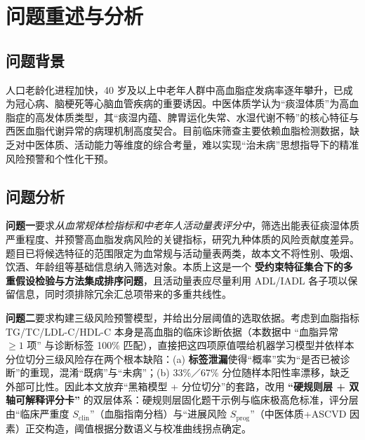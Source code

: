 \documentclass{MathorCupmodeling}
\begin{document}
\begin{abstract}
\textbf{问题三}：构建 6 个月有限时域\textbf{动态规划}模型。决策变量为每月的调理分级 $L_t$、活动强度 $s_t$、周训练频次 $f_t$；严格整合年龄、评分、预算（$\le 2000$ 元）等约束以及附表 3 的动力学公式；设计四项复合目标 $J = \alpha P_6 + \beta \text{Cost} + \gamma \sum \max(0, f_t - 5) + \delta \sum(3 - s_t)$。求解 278 名痰湿体质患者的方案，发现明确匹配规律：\textbf{年龄越小、活动能力越强的患者趋向高强度低频次方案}（$s=2\text{--}3$，$f=5$，平均降幅 31\%）；年龄组 5 或活动量表 $<40$ 的患者仅能选 1 级强度（平均降幅 17.9\%）。样本 1（女，50--59，$P_0=64$，$\text{Act}=38$）总成本 700 元，$P_6=50.57$（降 21.0\%）；样本 2（男，40--49，$P_0=58$，$\text{Act}=40$）总成本 780 元，$P_6=40.02$（降 31.0\%）；样本 3（女，40--49，$P_0=59$，$\text{Act}=63$）总成本 1190 元，$P_6=33.51$（降 43.2\%）。
\end{abstract}

\tableofcontents
\newpage

\section{问题重述与分析}

\subsection{问题背景}

人口老龄化进程加快，40 岁及以上中老年人群中高血脂症发病率逐年攀升，已成为冠心病、脑梗死等心脑血管疾病的重要诱因。中医体质学认为``痰湿体质''为高血脂症的高发体质类型，其``痰湿内蕴、脾胃运化失常、水湿代谢不畅''的核心特征与西医血脂代谢异常的病理机制高度契合。目前临床筛查主要依赖血脂检测数据，缺乏对中医体质、活动能力等维度的综合考量，难以实现``治未病''思想指导下的精准风险预警和个性化干预。

\subsection{问题分析}

\textbf{问题一}要求\textit{从血常规体检指标和中老年人活动量表评分中}，筛选出能表征痰湿体质严重程度、并预警高血脂发病风险的关键指标，研究九种体质的风险贡献度差异。题目已将候选特征的范围限定为血常规与活动量表两类，故本文不将性别、吸烟、饮酒、年龄组等基础信息纳入筛选对象。本质上这是一个 \textbf{受约束特征集合下的多重假设检验与方法集成排序问题}，且活动量表应尽量利用 ADL/IADL 各子项以保留信息，同时须排除冗余汇总项带来的多重共线性。

\textbf{问题二}要求构建三级风险预警模型，并给出分层阈值的选取依据。考虑到血脂指标 TG/TC/LDL-C/HDL-C 本身是高血脂的临床诊断依据（本数据中 ``血脂异常 $\ge 1$ 项'' 与诊断标签 100\% 匹配），直接把这四项原值喂给机器学习模型并依样本分位切分三级风险存在两个根本缺陷：(a) \textbf{标签泄漏}使得``概率''实为``是否已被诊断''的重现，混淆``既病''与``未病''；(b) 33\%／67\% 分位随样本阳性率漂移，缺乏外部可比性。因此本文放弃``黑箱模型 + 分位切分''的套路，改用 \textbf{``硬规则层 + 双轴可解释评分卡''} 的双层体系：硬规则层固化题干示例与临床极高危标准，评分层由``临床严重度 $S_{\text{clin}}$''（血脂指南分档）与``进展风险 $S_{\text{prog}}$''（中医体质+ASCVD 因素）正交构造，阈值根据分数语义与校准曲线拐点确定。
\end{document}
